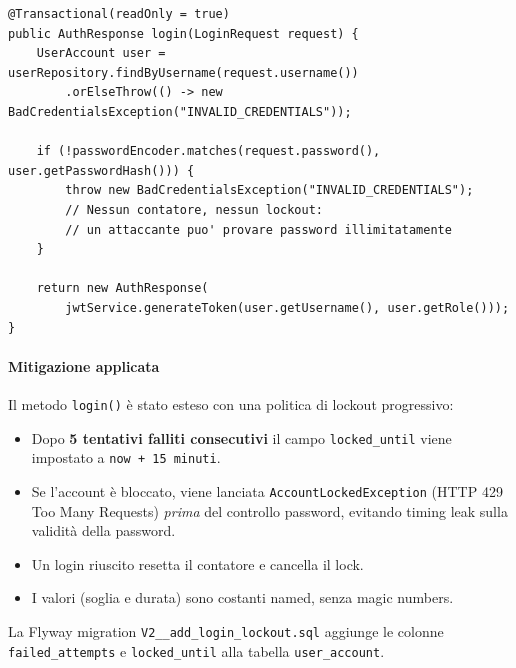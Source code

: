﻿\documentclass[a4paper,12pt]{report}
\begin{document}
\begin{insecurebox}[title={Codice Vulnerabile --- AuthServiceImpl.java (baseline, branch \texttt{pre-secure-coding})}]
\begin{lstlisting}[style=java]
@Transactional(readOnly = true)
public AuthResponse login(LoginRequest request) {
    UserAccount user = userRepository.findByUsername(request.username())
        .orElseThrow(() -> new BadCredentialsException("INVALID_CREDENTIALS"));

    if (!passwordEncoder.matches(request.password(), user.getPasswordHash())) {
        throw new BadCredentialsException("INVALID_CREDENTIALS");
        // Nessun contatore, nessun lockout:
        // un attaccante puo' provare password illimitatamente
    }

    return new AuthResponse(
        jwtService.generateToken(user.getUsername(), user.getRole()));
}
\end{lstlisting}
\end{insecurebox}

\paragraph{Mitigazione applicata}
Il metodo \texttt{login()} è stato esteso con una politica di lockout progressivo:
\begin{itemize}
  \item Dopo \textbf{5 tentativi falliti consecutivi} il campo \texttt{locked\_until}
        viene impostato a \texttt{now + 15 minuti}.
  \item Se l'account è bloccato, viene lanciata \texttt{AccountLockedException}
        (HTTP 429 Too Many Requests) \emph{prima} del controllo password,
        evitando timing leak sulla validità della password.
  \item Un login riuscito resetta il contatore e cancella il lock.
  \item I valori (soglia e durata) sono costanti named, senza magic numbers.
\end{itemize}

La Flyway migration \texttt{V2\_\_add\_login\_lockout.sql} aggiunge le colonne
\\ \texttt{failed\_attempts} e \texttt{locked\_until} alla tabella \texttt{user\_account}.
\end{document}
